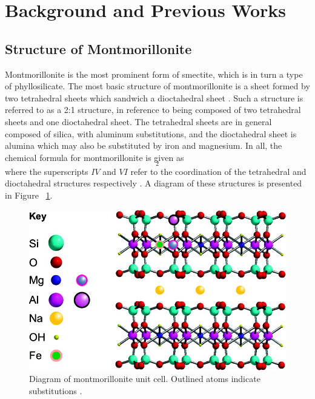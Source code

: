 \section{Background and Previous Works}
\subsection{Structure of Montmorillonite}
Montmorillonite is the most prominent form of smectite, which is in turn a type of phyllosilicate. The most basic structure of montmorillonite is a sheet formed by two tetrahedral sheets which sandwich a dioctahedral sheet \cite{sposito1984surface}. Such a structure is referred to as a 2:1 structure, in reference to being composed of two tetrahedral sheets and one dioctahedral sheet. The tetrahedral sheets are in general composed of silica, with aluminum substitutions, and the dioctahedral sheet is alumina which may also be substituted by iron and magnesium. In all, the chemical formula for montmorillonite is given as
\begin{equation*}
	[(Si_{3.88}Al_{0.12})^{IV}(Al_{1.64}Fe_{0.05}^3Mg_{0.36})^{VI}O_{10}(OH)_2]_2
\end{equation*}
where the superscripts $IV$ and $VI$ refer to the coordination of the tetrahedral and dioctahedral structures respectively \cite{van1977introduction}. A diagram of these structures is presented in Figure ~\ref{fig:clay_structure}.
\resetfootnote
\begin{figure}
	\centering
	\includegraphics[scale=1.75]{images/clay_structure.jpg}
	\caption{Diagram of montmorillonite unit cell\protect\footnotemark. Outlined atoms indicate substitutions \cite{joshi2009mechanism}.}
	\label{fig:clay_structure}
\end{figure}

